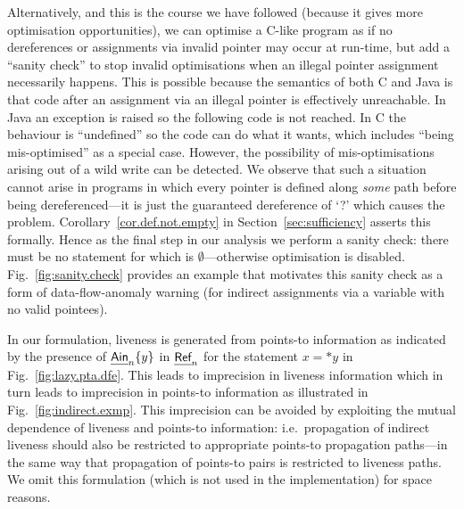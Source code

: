 \documentclass{llncs}
\newcommand{\ain}{\text{{\sf\em Ain\/}}\xspace}
\newcommand{\Def}{\text{{\sf\em Def}}\xspace}
\newcommand{\Ref}{\text{{\sf\em Ref}}\xspace} \newcommand{\sRef}{\text{{\sf\em sRef}}\xspace}
\begin{document}
Alternatively, and this is the course we have followed (because it
gives more optimisation opportunities), we can optimise a C-like
program as if no dereferences or assignments via invalid pointer
may occur at run-time, but add a ``sanity check'' to stop invalid
optimisations when an illegal pointer assignment necessarily happens.
This is possible because the semantics of both C and Java is that code
after an assignment via an illegal pointer is effectively unreachable.
In Java an exception is raised so the following code is not reached.
In C the behaviour is ``undefined'' so the code can do what it wants,
which includes ``being mis-optimised'' as a special case. However, the
possibility of mis-optimisations arising out of a wild write can be
detected.
We observe that such a situation cannot arise in programs in which every
pointer is defined along {\em some} path before being dereferenced---it
is just the guaranteed dereference of `?' which causes the problem.
Corollary~\ref{cor.def.not.empty} in Section~\ref{sec:sufficiency}
asserts this formally. Hence as the final step in our analysis we
perform a sanity check: there must be no statement 
for which \text{$\Def_n$} is $\emptyset$---otherwise optimisation
is disabled. Fig.~\ref{fig:sanity.check} provides an example that
motivates this sanity check as a form of data-flow-anomaly warning (for
indirect assignments via a variable with no valid pointees).




In our formulation, liveness is generated from points-to information as
indicated by the presence of $\ain_n\{y\}$ in $\Ref_n$ for the statement
$x=*y$ in Fig.~\ref{fig:lazy.pta.dfe}. This leads to imprecision in
liveness information which in turn leads to imprecision in points-to
information as illustrated in Fig.~\ref{fig:indirect.exmp}.
This imprecision can be avoided by exploiting
the mutual dependence of liveness and points-to information: i.e.\
propagation of indirect liveness should also be restricted to
appropriate points-to propagation paths---in the same way that
propagation of points-to pairs is restricted to liveness paths.
We omit this formulation (which is not used in the implementation)
for space reasons.
\end{document}
